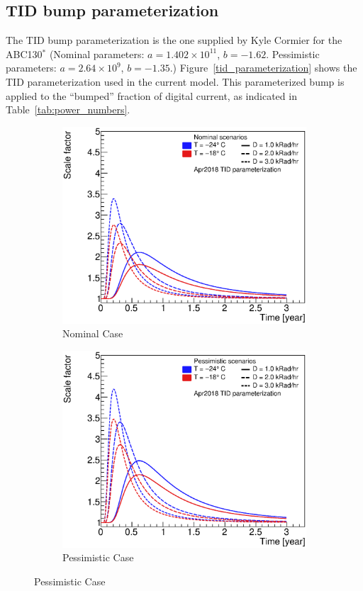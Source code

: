 \subsection{TID bump parameterization}
\label{tid_parameterization_details}

The TID bump parameterization is the one supplied by Kyle Cormier for the ABC130$^{*}$
(Nominal parameters: $a=1.402\times 10^{11}$, $b=-1.62$.
Pessimistic parameters: $a=2.64\times10^{9}$, $b=-1.35$.)
Figure~\ref{tid_parameterization} shows the TID parameterization used in the current model. This
parameterized bump is applied to the ``bumped'' fraction of digital current, as indicated in
Table~\ref{tab:power_numbers}.

\begin{figure}[ht!]
\begin{center}
\begin{subfigure}[t]{0.49\textwidth}\includegraphics[width=0.99\linewidth]{figures/AbcTidBumpVersionRatesAndTemps_Nominal}\caption{Nominal Case}\end{subfigure}
\begin{subfigure}[t]{0.49\textwidth}\includegraphics[width=0.99\linewidth]{figures/AbcTidBumpVersionRatesAndTemps_Pessimistic}\caption{Pessimistic Case}\end{subfigure}

\end{center}
\end{figure}
